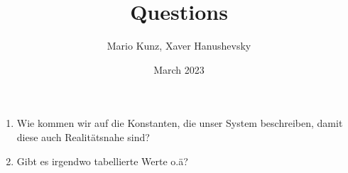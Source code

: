 \documentclass{article}
\title{Questions}
\author{Mario Kunz, Xaver Hanushevsky}
\date{March 2023}
\begin{document}
\begin{enumerate}
    \item Wie kommen wir auf die Konstanten, die unser System beschreiben, damit diese auch Realitätsnahe sind?
    \item Gibt es irgendwo tabellierte Werte o.ä?
\end{enumerate}
\end{document}
